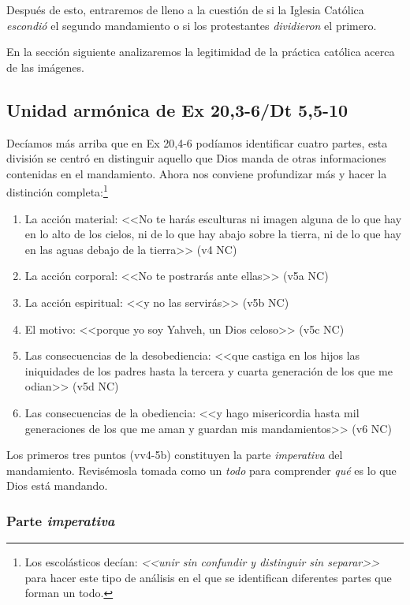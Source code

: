 \documentclass{article}
\begin{document}
Despu\'es de esto, entraremos de lleno a la cuesti\'on de si la Iglesia Cat\'olica \emph{escondi\'o} el segundo mandamiento o si los protestantes \emph{dividieron} el primero.

En la secci\'on siguiente analizaremos la legitimidad de la pr\'actica cat\'olica acerca de las im\'agenes.

\subsection{Unidad arm\'onica de Ex 20,3-6/Dt 5,5-10}

Dec\'{i}amos m\'as arriba que en Ex 20,4-6 pod\'{i}amos identificar cuatro partes, esta divisi\'on se centr\'o en distinguir aquello que Dios manda de otras informaciones contenidas en el mandamiento. Ahora nos conviene profundizar m\'as y hacer la distinci\'on completa:\footnote{Los escol\'asticos dec\'{i}an: \emph{<<unir sin confundir y distinguir sin separar>>} para hacer este tipo de an\'alisis en el que se identifican diferentes partes que forman un todo.}

\begin{enumerate}
\item La acci\'on material: <<No te har\'as esculturas ni imagen alguna de lo que hay en lo alto de los cielos, ni de lo que hay abajo sobre la tierra, ni de lo que hay en las aguas debajo de la tierra>> (v4 NC)
\item La acci\'on corporal: <<No te postrar\'as ante ellas>> (v5a NC)
\item La acci\'on espiritual: <<y no las servir\'as>> (v5b NC)
\item El motivo: <<porque yo soy Yahveh, un Dios celoso>> (v5c NC)
\item Las consecuencias de la desobediencia: <<que castiga en los hijos las iniquidades de los padres hasta la tercera y cuarta generaci\'on de los que me odian>> (v5d NC)
\item Las consecuencias de la obediencia: <<y hago misericordia hasta mil generaciones de los que me aman y guardan mis mandamientos>> (v6 NC)
\end{enumerate}

\noindent
Los primeros tres puntos (vv4-5b) constituyen la parte \emph{imperativa} del mandamiento. Revis\'emosla tomada como un \emph{todo} para comprender \emph{qu\'e} es lo que Dios est\'a mandando.

\subsubsection{Parte \emph{imperativa}}
\end{document}
